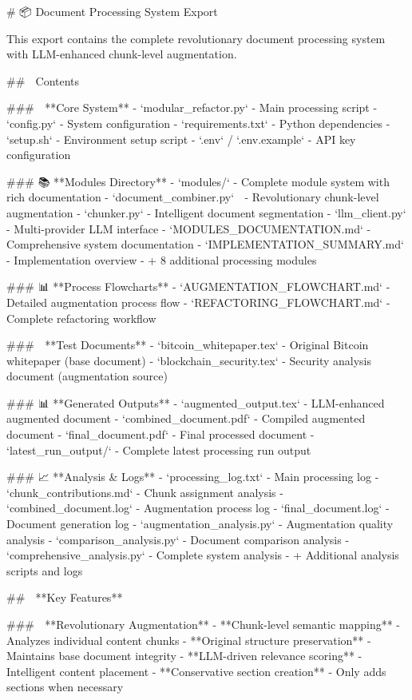 # 📦 Document Processing System Export

This export contains the complete revolutionary document processing system with LLM-enhanced chunk-level augmentation.

## 📁 Contents

### 🚀 **Core System**
- `modular_refactor.py` - Main processing script
- `config.py` - System configuration
- `requirements.txt` - Python dependencies
- `setup.sh` - Environment setup script
- `.env` / `.env.example` - API key configuration

### 📚 **Modules Directory**
- `modules/` - Complete module system with rich documentation
  - `document_combiner.py` 🌟 - Revolutionary chunk-level augmentation
  - `chunker.py` - Intelligent document segmentation
  - `llm_client.py` - Multi-provider LLM interface
  - `MODULES_DOCUMENTATION.md` - Comprehensive system documentation
  - `IMPLEMENTATION_SUMMARY.md` - Implementation overview
  - + 8 additional processing modules

### 📊 **Process Flowcharts**
- `AUGMENTATION_FLOWCHART.md` - Detailed augmentation process flow
- `REFACTORING_FLOWCHART.md` - Complete refactoring workflow

### 📄 **Test Documents**
- `bitcoin_whitepaper.tex` - Original Bitcoin whitepaper (base document)
- `blockchain_security.tex` - Security analysis document (augmentation source)

### 📊 **Generated Outputs**
- `augmented_output.tex` - LLM-enhanced augmented document
- `combined_document.pdf` - Compiled augmented document
- `final_document.pdf` - Final processed document
- `latest_run_output/` - Complete latest processing run output

### 📈 **Analysis & Logs**
- `processing_log.txt` - Main processing log
- `chunk_contributions.md` - Chunk assignment analysis
- `combined_document.log` - Augmentation process log
- `final_document.log` - Document generation log
- `augmentation_analysis.py` - Augmentation quality analysis
- `comparison_analysis.py` - Document comparison analysis
- `comprehensive_analysis.py` - Complete system analysis
- + Additional analysis scripts and logs

## 🎯 **Key Features**

### 🧠 **Revolutionary Augmentation**
- **Chunk-level semantic mapping** - Analyzes individual content chunks
- **Original structure preservation** - Maintains base document integrity
- **LLM-driven relevance scoring** - Intelligent content placement
- **Conservative section creation** - Only adds sections when necessary

